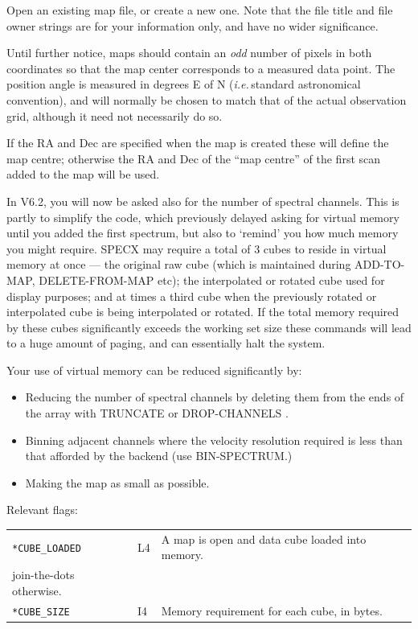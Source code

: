 \documentclass[11pt,twoside]{report}
\newcommand{\ie}{{\it i.e.\,}}
\begin{document}
Open an existing map file, or create a new one. Note that the file title
and file owner strings are for your information only, and have no
wider significance.

Until further notice, maps should contain an {\em odd} number of pixels
in both coordinates so that the map center corresponds to a measured
data point. The position angle is measured in degrees E of N (\ie standard
astronomical convention), and will normally be chosen to match that of the
actual observation grid, although it need not necessarily do so.

If the RA and Dec are specified when the map is created these will define
the map centre; otherwise the RA and Dec of the ``map centre'' of the first
scan added to the map will be used.

In V6.2, you will now be asked also for the number of spectral channels.
This is partly to simplify the code, which previously delayed asking for
virtual memory until you added the first spectrum, but also to `remind'
you how much memory you might require. SPECX may require a total of 3
cubes to reside in virtual memory at once --- the original raw cube (which
is maintained during ADD-TO-MAP, DELETE-FROM-MAP etc); the interpolated 
or rotated cube used for display purposes; and at times a third cube when
the previously rotated or interpolated cube is being interpolated or rotated.
If the total memory required by these cubes significantly exceeds the 
working set size these commands will lead to a huge amount of paging, and
can essentially halt the system.

Your use of virtual memory can be reduced significantly by:
\begin{itemize}
\item Reducing the number of spectral channels by deleting them from the
ends of the array with TRUNCATE or DROP-CHANNELS
.
\item Binning adjacent channels where the velocity resolution required is
less than that afforded by the backend (use BIN-SPECTRUM.)
\item Making the map as small as possible.
\end{itemize}

Relevant flags:\\
\begin{tabular}{lll}
  \verb+*CUBE_LOADED+  & L4 & A map is open and data cube loaded into memory.\\
                            join-the-dots otherwise.\\
  \verb+*CUBE_SIZE+    & I4 & Memory requirement for each cube, in bytes.\\
\end{tabular}
\end{document}
